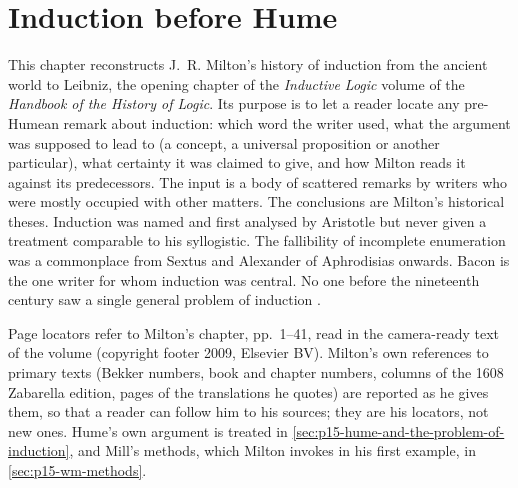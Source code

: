 \chapter{Induction before Hume}
\label{sec:p15-w02b-p15-026-milton}

This chapter reconstructs J.~R. Milton's history of induction from
the ancient world to Leibniz, the opening chapter of the
\emph{Inductive Logic} volume of the \emph{Handbook of the History of
Logic}. Its purpose is to let a reader locate any pre-Humean remark
about induction: which word the writer used, what the argument was
supposed to lead to (a concept, a universal proposition or another
particular), what certainty it was claimed to give, and how Milton
reads it against its predecessors. The input is a body of scattered
remarks by writers who were mostly occupied with other matters. The
conclusions are Milton's historical theses. Induction was named and
first analysed by Aristotle but never given a treatment comparable to
his syllogistic. The fallibility of incomplete enumeration was a
commonplace from Sextus and Alexander of Aphrodisias onwards. Bacon is
the one writer for whom induction was central. No one before the
nineteenth century saw a single general problem of induction
\cite[pp.~1--2, 8, 10, 36--37]{Milton2011InductionBeforeHume}.

Page locators refer to Milton's chapter, pp.~1--41, read in the
camera-ready text of the volume (copyright footer 2009, Elsevier BV).
Milton's own references to primary texts (Bekker numbers, book and
chapter numbers, columns of the 1608 Zabarella edition, pages of the
translations he quotes) are reported as he gives them, so that a reader
can follow him to his sources; they are his locators, not new ones.
Hume's own argument is treated in
\cref{sec:p15-hume-and-the-problem-of-induction}, and Mill's methods,
which Milton invokes in his first example, in \cref{sec:p15-wm-methods}.

